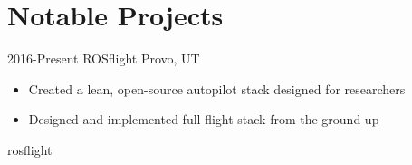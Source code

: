 
\section{Notable Projects}

\begin{entrylist}
\logoentry
{2016-Present}
{ROSflight}
{Provo, UT}
{
\begin{itemize}
	\item Created a lean, open-source autopilot stack designed for researchers
	\item Designed and implemented full flight stack from the ground up
\end{itemize}
}
{rosflight}
\end{entrylist}